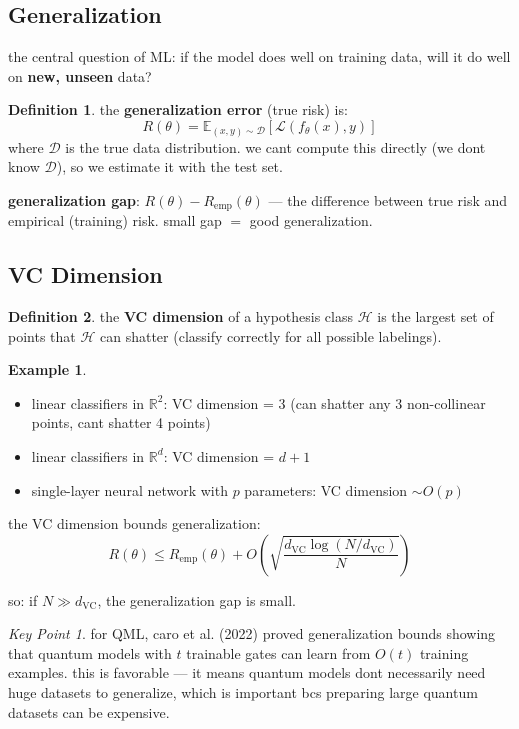 \documentclass[11pt,a4paper]{article}
\theoremstyle{definition}
\newtheorem{definition}{Definition}[section]
\newtheorem{example}{Example}[section]
\theoremstyle{remark}
\newtheorem*{keypoint}{Key Point}
\begin{document}
\subsection{Generalization}

the central question of ML: if the model does well on training data, will it do well on \textbf{new, unseen} data?

\begin{definition}
the \textbf{generalization error} (true risk) is:
\[
R(\theta) = \mathbb{E}_{(x,y) \sim \mathcal{D}}[\mathcal{L}(f_\theta(x), y)]
\]
where $\mathcal{D}$ is the true data distribution. we cant compute this directly (we dont know $\mathcal{D}$), so we estimate it with the test set.
\end{definition}

\textbf{generalization gap}: $R(\theta) - R_{\text{emp}}(\theta)$ --- the difference between true risk and empirical (training) risk. small gap $=$ good generalization.

\subsection{VC Dimension}

\begin{definition}
the \textbf{VC dimension} of a hypothesis class $\mathcal{H}$ is the largest set of points that $\mathcal{H}$ can shatter (classify correctly for all possible labelings).
\end{definition}

\begin{example}
\begin{itemize}
    \item linear classifiers in $\mathbb{R}^2$: VC dimension = 3 (can shatter any 3 non-collinear points, cant shatter 4 points)
    \item linear classifiers in $\mathbb{R}^d$: VC dimension = $d + 1$
    \item single-layer neural network with $p$ parameters: VC dimension $\sim O(p)$
\end{itemize}
\end{example}

the VC dimension bounds generalization:
\[
R(\theta) \leq R_{\text{emp}}(\theta) + O\left(\sqrt{\frac{d_{\text{VC}} \log(N/d_{\text{VC}})}{N}}\right)
\]

so: if $N \gg d_{\text{VC}}$, the generalization gap is small.

\begin{keypoint}
for QML, caro et al. (2022) proved generalization bounds showing that quantum models with $t$ trainable gates can learn from $O(t)$ training examples. this is favorable --- it means quantum models dont necessarily need huge datasets to generalize, which is important bcs preparing large quantum datasets can be expensive.
\end{keypoint}
\end{document}
